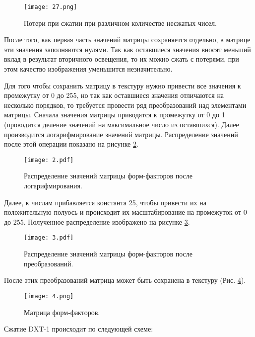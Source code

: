 \documentclass[12pt,fleqn]{article}
\begin{document}
\begin{figure}[htb]
    \centering
    \texttt{[image: 27.png]}
    \caption{Потери при сжатии при различном количестве несжатых чисел.}
    \label{part_error}
\end{figure}

После того, как первая часть значений матрицы сохраняется отдельно, в матрице эти значения заполняются нулями. Так как оставшиеся значения вносят меньший вклад в результат вторичного освещения, то их можно сжать с потерями, при этом качество изображения уменьшится незначительно.

Для того чтобы сохранить матрицу в текстуру нужно привести все значения к промежутку от 0 до 255, но так как оставшиеся значения отличаются на несколько порядков, то требуется провести ряд преобразований над элементами матрицы. Сначала значения матрицы приводятся к промежутку от 0 до 1 (проводится деление значений на максимальное число из оставшихся). Далее производится логарифмирование значений матрицы. Распределение значений после этой операции показано на рисунке \ref{log_distribution}.

\begin{figure}[htb]
    \centering
    \texttt{[image: 2.pdf]}
    \caption{Распределение значений матрицы форм-факторов после логарифмирования.}
    \label{log_distribution}
\end{figure}

Далее, к числам прибавляется константа 25, чтобы привести их на положительную полуось и происходит их масштабирование на промежуток от 0 до 255. Полученное распределение изображено на рисунке \ref{result_distribution}.

\begin{figure}[htb]
    \centering
    \texttt{[image: 3.pdf]}
    \caption{Распределение значений матрицы форм-факторов после преобразований.}
    \label{result_distribution}
\end{figure}

После этих преобразований матрица может быть сохранена в текстуру (Рис. \ref{ff_matrix}).

\pagebreak

\begin{figure}[htb]
    \centering
    \texttt{[image: 4.png]}
    \caption{Матрица форм-факторов.}
    \label{ff_matrix}
\end{figure}

Сжатие DXT-1 происходит по следующей схеме:
\end{document}
